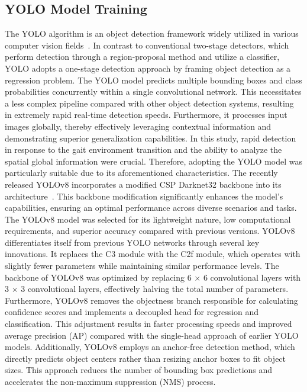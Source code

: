 \documentclass[actuators,article,accept,pdftex,moreauthors]{Definitions/mdpi}
\begin{document}
\subsection{{YOLO Model Training}} %
{The }YOLO algorithm is {an} object detection framework widely utilized in various computer vision fields~\cite{Redmon2016}. In contrast to conventional two-stage detectors, which perform detection through a region-proposal method and utilize a classifier, YOLO adopts a one-stage detection approach by framing object detection as a regression problem. The YOLO model predicts multiple bounding boxes and class probabilities concurrently within a single convolutional network. This necessitates a less complex pipeline compared with other object detection systems, resulting in extremely rapid real-time detection speeds. Furthermore, it processes input images globally, thereby effectively leveraging contextual information and demonstrating superior generalization capabilities. In this study, rapid detection in response to the gait environment transition and the ability to analyze the spatial global information were crucial. Therefore, adopting the YOLO model was particularly suitable due to its aforementioned characteristics.
The recently released YOLOv8 incorporates a modified CSP Darknet32 backbone into its architecture~\cite{Terven2023}. This backbone modification significantly enhances the model's capabilities, ensuring an optimal performance across diverse scenarios and tasks. The YOLOv8 model was selected for its lightweight nature, low computational requirements, and superior accuracy compared with previous versions.
YOLOv8 differentiates itself from previous YOLO networks through several key innovations. It replaces the C3 module with the C2f module, which operates with slightly fewer parameters while maintaining similar performance levels. The backbone of YOLOv8 was optimized by replacing 6 × 6 convolutional layers with 3 × 3 convolutional layers, effectively halving the total number of parameters. %
Furthermore, YOLOv8 removes the objectness branch responsible for calculating confidence scores and implements a decoupled head for regression and classification. This adjustment results in faster processing speeds and improved average precision (AP) compared with the single-head approach of earlier YOLO models. Additionally, YOLOv8 employs an anchor-free detection method, which directly predicts object centers rather than resizing anchor boxes to fit object sizes. This approach reduces the number of bounding box predictions and accelerates the non-maximum suppression (NMS) process.
\end{document}
